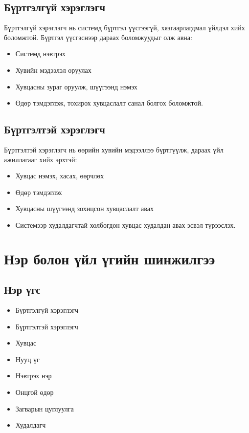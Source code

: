 



\subsection{Бүртгэлгүй хэрэглэгч}
Бүртгэлгүй хэрэглэгч нь системд бүртгэл үүсгээгүй, хязгаарлагдмал үйлдэл хийх боломжтой. Бүртгэл үүсгэснээр дараах боломжуудыг олж авна:
\begin{itemize}
    \item Системд нэвтрэх
    \item Хувийн мэдээлэл оруулах
    \item Хувцасны зураг оруулж, шүүгээнд нэмэх
    \item Өдөр тэмдэглэж, тохирох хувцаслалт санал болгох боломжтой.
\end{itemize}

\subsection{Бүртгэлтэй хэрэглэгч}
Бүртгэлтэй хэрэглэгч нь өөрийн хувийн мэдээллээ бүртгүүлж, дараах үйл ажиллагааг хийх эрхтэй:
\begin{itemize}
    \item Хувцас нэмэх, хасах, өөрчлөх
    \item Өдөр тэмдэглэх
    \item Хувцасны шүүгээнд зохицсон хувцаслалт авах
    \item Системээр худалдагчтай холбогдон хувцас худалдан авах эсвэл түрээслэх.
\end{itemize}

\section{Нэр болон үйл үгийн шинжилгээ}

\subsection{Нэр үгс}
\begin{itemize}
    \item Бүртгэлгүй хэрэглэгч
    \item Бүртгэлтэй хэрэглэгч
    \item Хувцас
    \item Нууц үг
    \item Нэвтрэх нэр
    \item Онцгой өдөр
    \item Загварын цуглуулга
    \item Худалдагч
\end{itemize}

